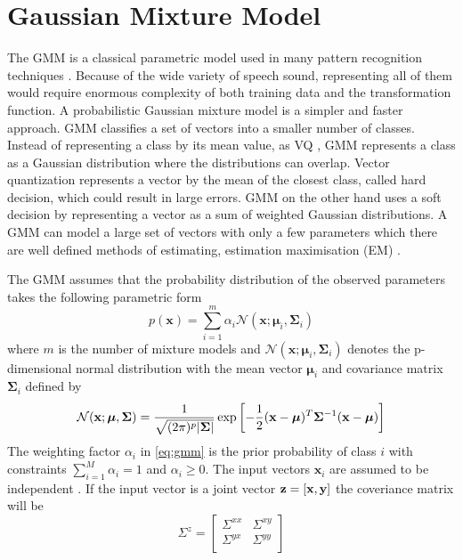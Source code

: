 \section{Gaussian Mixture Model} %
\label{sec:gaussian_mixture_model}
The GMM is a classical parametric model used in many pattern recognition techniques \cite{stylianou98}. Because of the wide variety of speech sound, representing all of them would require enormous complexity of both training data and the transformation function. A probabilistic Gaussian mixture model is a simpler and faster approach. GMM classifies a set of vectors into a smaller number of classes. Instead of representing a class by its mean value, as VQ \cite{gray84}, GMM represents a class as a Gaussian distribution where the distributions can overlap. Vector quantization represents a vector by the mean of the closest class, called hard decision, which could result in large errors. GMM on the other hand uses a soft decision by representing a vector as a sum of weighted Gaussian distributions. A GMM can model a large set of vectors with only a few parameters which there are well defined methods of estimating, \eg estimation maximisation (EM) \cite{taletek}.

The GMM assumes that the probability distribution of the observed parameters takes the following parametric form
\newcommand{\nnn}{\mathcal N}
\begin{equation}
	\label{eq:gmm}
	p(\mathbf{x}) = \sum_{i=1}^{m} \alpha_i \nnn(\mathbf{x}; \boldsymbol{\mu}_i, \mathbf{\Sigma}_i)
\end{equation}
where $m$ is the number of mixture models and $\nnn(\mathbf{x}; \boldsymbol{\mu}_i, \mathbf{\Sigma}_i)$ denotes the p-dimensional normal distribution \cite{statistikk} with the mean vector $\boldsymbol{\mu}_i$ and covariance matrix $\mathbf{\Sigma}_i$ defined by
\begin{equation}
	\nnn(\mathbf{x}; \boldsymbol{\mu}, \mathbf{\Sigma}) = \frac{1}{\sqrt{(2\pi)^p\abs{\mathbf{\Sigma}}}} \exp\sbrackets{-\frac{1}{2} (\mathbf{x} -\boldsymbol{\mu})^T \mathbf{\Sigma}^{-1} (\mathbf{x} -\boldsymbol{\mu})}
\end{equation}
The weighting factor $\alpha_i$ in \eqref{eq:gmm} is the prior probability of class $i$ with constraints $\sum_{i=1}^{M}\alpha_i = 1$ and $\alpha_i \geq 0$. The input vectors $\mathbf{x}_i$ are assumed to be independent \cite{stylianou98}. If the input vector is a joint vector $\mathbf{z}=\left[\mathbf{x},\mathbf{y}\right]$ the coveriance matrix will be
\begin{equation}
	\Sigma^z = \begin{bmatrix}
		\Sigma^{xx} & \Sigma^{xy} \\
		\Sigma^{yx} & \Sigma^{yy} \\
	\end{bmatrix}
\end{equation}

